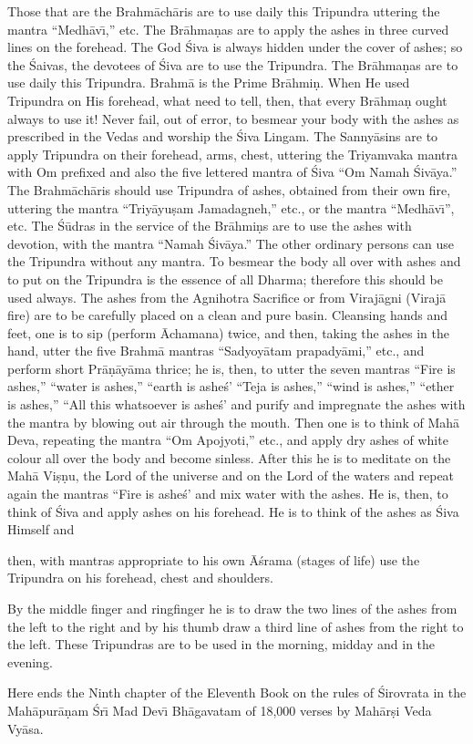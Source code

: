 Those that are the Brahm\=ach\=aris are to use daily this Tripundra uttering the mantra ``Medh\=av\={\i},'' etc. The Br\=ahma\d{n}as are to apply the ashes in three curved lines on the forehead. The God \'Siva is always hidden under the cover of ashes; so the \'Saivas, the devotees of \'Siva are to use the Tripundra. The Br\=ahma\d{n}as are to use daily this Tripundra. Brahm\=a is the Prime Br\=ahmi\d{n}. When He used Tripundra on His forehead, what need to tell, then, that every Br\=ahma\d{n} ought always to use it! Never fail, out of error, to besmear your body with the ashes as prescribed in the Vedas and worship the \'Siva Lingam. The Sanny\=asins are to apply Tripundra on their forehead, arms, chest, uttering the Triyamvaka mantra with Om prefixed and also the five lettered mantra of \'Siva ``Om Namah \'Siv\=aya.'' The Brahm\=ach\=aris should use Tripundra of ashes, obtained from their own fire, uttering the mantra ``Triy\=ayu\d{s}am Jamadagneh,'' etc., or the mantra ``Medh\=av\={\i}'', etc. The \'S\=udras in the service of the Br\=ahmi\d{n}s are to use the ashes with devotion, with the mantra ``Namah \'Siv\=aya.'' The other ordinary persons can use the Tripundra without any mantra. To besmear the body all over with ashes and to put on the Tripundra is the essence of all Dharma; therefore this should be used always. The ashes from the Agnihotra Sacrifice or from Viraj\=agni (Viraj\=a fire) are to be carefully placed on a clean and pure basin. Cleansing hands and feet, one is to sip (perform \=Achamana) twice, and then, taking the ashes in the hand, utter the five Brahm\=a mantras ``Sadyoy\=atam prapady\=ami,'' etc., and perform short Pr\=a\d{n}\=ay\=ama thrice; he is, then, to utter the seven mantras ``Fire is ashes,'' ``water is ashes,'' ``earth is ashe\'s' ``Teja is ashes,'' ``wind is ashes,'' ``ether is ashes,'' ``All this whatsoever is ashe\'s' and purify and impregnate the ashes with the mantra by blowing out air through the mouth. Then one is to think of Mah\=a Deva, repeating the mantra ``Om Apojyoti,'' etc., and apply dry ashes of white colour all over the body and become sinless. After this he is to meditate on the Mah\=a Vi\d{s}\d{n}u, the Lord of the universe and on the Lord of the waters and repeat again the mantras ``Fire is ashe\'s' and mix water with the ashes. He is, then, to think of \'Siva and apply ashes on his forehead. He is to think of the ashes as \'Siva Himself and

then, with mantras appropriate to his own \=A\'srama (stages of life) use the Tripundra on his forehead, chest and shoulders.

By the middle finger and ringfinger he is to draw the two lines of the ashes from the left to the right and by his thumb draw a third line of ashes from the right to the left. These Tripundras are to be used in the morning, midday and in the evening.

Here ends the Ninth chapter of the Eleventh Book on the rules of \'Sirovrata in the Mah\=apur\=a\d{n}am \'Sr\={\i} Mad Dev\={\i} Bh\=agavatam of 18,000 verses by Mah\=ar\d{s}i Veda Vy\=asa.



